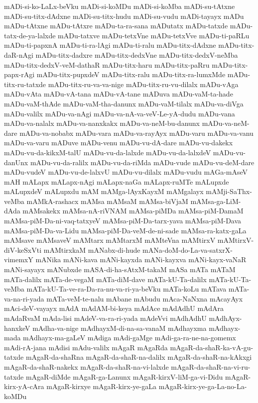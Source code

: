 {mADi-si-ko-LaLx-beVku
mADi-si-koMDu
mADi-si-koMba
mADi-su-tAtxne
mADi-su-titx-dAdxne
mADi-su-titx-hudu
mADi-su-vudu
mADi-tayayx
mADu
mADu-tAtxne
mADu-tAtxre
mADu-ta-ra-sana
mADutatx
mADu-tatxde
mADu-tatx-de-ya-lalxde
mADu-tatxve
mADu-tetxVne
mADu-tetxVve
mADu-ti-paRLu
mADu-ti-papxnA
mADu-ti-ra-lAgi
mADu-ti-ralu
mADu-titx-dAdxne
mADu-titx-daR-nAgi
mADu-titx-dadxre
mADu-titx-dedxVne
mADu-titx-dedxV-neMba
mADu-titx-dedxV-veM-dathaR
mADu-titx-haru
mADu-titx-paRru
mADu-titx-papx-rAgi
mADu-titx-pupxdeV
mADu-titx-ralu
mADu-titx-ra-lumxMde
mADu-titx-ru-tatxde
mADu-titx-ru-va-va-nige
mADu-titx-ru-vu-dilalx
mADu-vAga
mADu-vAta
mADu-vA-tana
mADu-vA-tane
mADuva
mADu-vaM-ta-hade
mADu-vaM-thAde
mADu-vaM-tha-danunx
mADu-vaM-tilalx
mADu-va-diVga
mADu-valilx
mADu-va-nAgi
mADu-va-nA-va-veV-Le-yA-dudu
mADu-vana
mADu-va-nalalx
mADu-va-nanxkakx
mADu-va-neM-bu-danunx
mADu-va-neM-dare
mADu-va-nobabx
mADu-vara
mADu-va-rayAyx
mADu-varu
mADu-va-vanu
mADu-va-varu
mADuve
mADu-venu
mADu-vu-dA-dare
mADu-vu-dakekx
mADu-vu-da-kikxM-talU
mADu-vu-da-lalxde
mADu-vu-da-lalxdeV
mADu-vu-danUnx
mADu-vu-da-ralilx
mADu-vu-da-riMda
mADu-vude
mADu-vu-deM-dare
mADu-vudeV
mADu-vu-de-lalxvU
mADu-vu-dilalx
mADu-vudu
mAGa-mAseV
mAH
mALapx
mALapx-nAgi
mALapx-naGa
mALapx-ruMTe
mALupxde
mALupxdeV
mALupxdu
mAM
mAMga-lAyxKayxM
mAMgalayx
mAMji-SaThx-veMba
mAMkA-rashacx
mAMsa
mAMsaM
mAMsa-biVjaM
mAMsa-ga-LiM-dAda
mAMsakekx
mAMsa-nA-riVNAM
mAMsa-piMDa
mAMsa-piM-DamaM
mAMsa-piM-Da-ni-vaq-tatxyeV
mAMsa-piM-Da-tarx-yava
mAMsa-piM-Dava
mAMsa-piM-Da-va-Lidu
mAMsa-piM-Da-veM-de-ni-sade
mAMsa-ra-katx-gaLa
mAMsave
mAMsaveV
mAMtarx
mAMtarxM
mAMteVna
mAMtirxV
mAMtirxV-diV-keSxVti
mAMtirxkaM
mANabx-di-hude
mANa-doM-do-La-va-satxrX-vimemxY
mANika
mANi-kava
mANi-kayxda
mANi-kayxva
mANi-kayx-vaNaR
mANi-sayayx
mANubxde
mASA-di-ha-sAtxM-takaM
mASa
mATa
mATaM
mATa-dalilx
mATa-de-vegaM
mATa-diM-dave
mATa-kU-Ta-dalilx
mATa-kU-Ta-veMba
mATa-kU-Ta-ve-ra-Da-ra-nu-va-ri-ya-beVku
mATa-koLu
mATava
mATa-va-na-ri-yada
mATa-veM-te-nalu
mAbane
mAbudu
mAca-NaNxna
mAcayAyx
mAci-deV-vayayx
mAdA
mAdAM-bi-keya
mAdAce
mAdAdhU
mAdAra
mAdaRvaM
mAda-lisi
mAdeV-va-ra-ri-yada
mAdeVvi
mAdhAdhU
mAdhAyx-hanxkeV
mAdha-va-nige
mAdhayxM-di-na-sa-vanaM
mAdhayxma
mAdhayx-mada
mAdhayx-ma-gaLeV
mAdiga
mAdi-gaMge
mAdi-ga-ra-ne-na-gomemx
mAdi-rA-jana
mAdisi
mAdu-valilx
mAgaR
mAgaRda
mAgaR-da-shaR-ka-vA-gu-tatxde
mAgaR-da-shaRna
mAgaR-da-shaR-na-dalilx
mAgaR-da-shaR-na-kAkxgi
mAgaR-da-shaR-nakekx
mAgaR-da-shaR-na-vi-lalxde
mAgaR-da-shaR-na-vi-ru-tatxde
mAgaR-diMde
mAgaR-ga-Lanunx
mAgaR-kirxV-liM-ga-vi-Didu
mAgaR-kirx-yA-cAra
mAgaR-kirxye
mAgaR-kirx-ye-gaLa
mAgaR-kirx-ye-ga-La-no-La-koMDu
}
